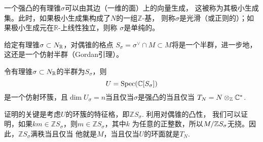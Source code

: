 \para 一个强凸的有理锥$\sigma$可以由其边（一维的面）上的向量生成，
这被称为其极小生成集。此时，如果极小生成集构成了$N$的一组$\mathbb Z$-基，
则称$\sigma$是光滑（或正则的）；如果极小生成元在$\mathbb R$-上线性独立，则称
$\sigma$是单纯的。

\para 给定有理锥$\sigma\subset N_{\mathbb{R}}$，对偶锥的格点
$S_\sigma=\sigma^\vee\cap M\subset M$将是一个半群，进一步地，
这还是一个仿射半群（Gordan引理）。

\begin{pro}
令有理锥$\sigma\subset N_{\mathbb{R}}$的半群为$S_\sigma$，则
\[
    U=\operatorname{Spec}(\mathbb{C}[S_\sigma])
\]
是一个仿射环簇，且$\dim U_\sigma=n$当且仅当$\sigma$是强凸的当且仅当
$T_N=N\otimes_{\mathbb{Z}}\mathbb{C}^*$.
\end{pro}

证明的关键是考虑$U$的环簇的特征格，即$\mathbb ZS_\sigma$. 利用对偶锥的凸性，
我们可以证明，如果$km\in \mathbb ZS_\sigma$，则$m\in \mathbb ZS_\sigma$，其中$k$
为任意的正整数，所以$M/\mathbb{Z} S_\sigma$无挠。因此，$\mathbb ZS_\sigma$满秩当且仅当
他就是$M$，当且仅当$U$的环面就是$T_N$.